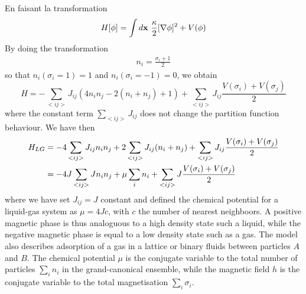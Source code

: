 {\color{red}
En faisant la transformation\begin{equation}
    H[\phi] = \int d{\bf x} \ \frac{\kappa}{2}[\nabla \phi]^2 + V(\phi)
    \label{landau-ginzburg-hamiltonian}
\end{equation}By doing the transformation\cite{goldenfeld_lectures_2018} 
\begin{align}
    n_i =  \frac{\sigma_i +1}{2}
\end{align}
so that $n_i(\sigma_i = 1) = 1$ and $n_i(\sigma_i = -1) = 0$, we obtain
\begin{equation}
	H =  - \sum_{< i j >}  J_{ij} \left( 4 n_i n_j -2 ( n_i+n_j) + 1 \right)+ \sum_{< i j >}  J_{ij} \frac{V(\sigma_i)+V(\sigma_j)}{2}  
\end{equation}
where the constant term $\sum_{< i j >}  J_{ij}$ does not change the partition function behaviour. We have then
\begin{align}
	H_{LG} &=  - 4 \sum_{< i j >}  J_{ij}  n_i n_j  + 2 \sum_{< i j >}  J_{ij}  (n_i+n_j) + \sum_{< i j >}  J_{ij} \frac{V(\sigma_i)+V(\sigma_j)}{2}  \nonumber \\
       &=  - 4 J \sum_{< i j >}  J n_i n_j  + \mu \sum_i  n_i + \sum_{< i j >}  J \frac{V(\sigma_i)+V(\sigma_j)}{2}  
\end{align}
where we have set $J_{ij} = J$ constant and defined the chemical potential for a liquid-gas system as $\mu=4Jc$, with  $c$ the number of nearest neighboors. A positive magnetic phase is thus analoguous to a high density state such a liquid, while the negative magnetic phase is equal to a low density state such as a gas. The model also describes adsorption of a gas in a lattice or binary fluids between particles $A$ and $B$.
The chemical potential $\mu$ is the conjugate variable to the total number of particles $\sum_i n_i$ in the grand-canonical ensemble, while the magnetic field $h$ is the conjugate variable to the total magnetisation $\sum_i \sigma_i$.
}

